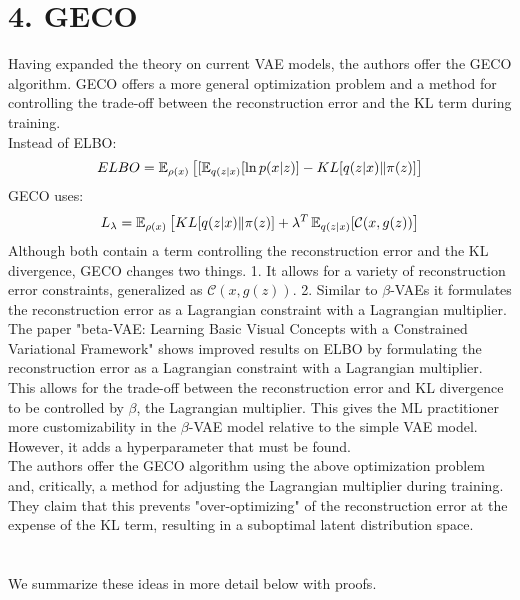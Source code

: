 \section*{4. GECO}
Having expanded the theory on current VAE models, the authors offer the GECO algorithm. GECO offers a more general optimization problem and a method for controlling the trade-off between the reconstruction error and the KL term during training.\\
Instead of ELBO:
\begin{gather*}
{ELBO} =  \operatorname{\mathbb{E}}_{\rho(x)}\left[[\operatorname{\mathbb{E}}_{q(z|x)}[\ln{p(x|z)}] - KL[q(z|x) \| \pi(z)]\right]
\end{gather*}
GECO uses:
\begin{gather*}
L_{\lambda} = \operatorname{\mathbb{E}}_{\rho(x)}\left[KL[q(z|x) \| \pi(z)] + \lambda^{T}\operatorname{\mathbb{E}}_{q(z|x)}[\mathcal{C}(x, g(z))\right]
\end{gather*}
Although both contain a term controlling the reconstruction error and the KL divergence, GECO changes two things. 1. It allows for a variety of reconstruction error constraints, generalized as $\mathcal{C}(x, g(z))$. 2. Similar to $\beta$-VAEs it formulates the reconstruction error as a Lagrangian constraint with a Lagrangian multiplier.\\
The paper "beta-VAE: Learning Basic Visual Concepts with a Constrained Variational Framework" shows improved results on ELBO by formulating the reconstruction error as a Lagrangian constraint with a Lagrangian multiplier. This allows for the trade-off between the reconstruction error and KL divergence to be controlled by $\beta$, the Lagrangian multiplier. This gives the ML practitioner more customizability in the $\beta$-VAE model relative to the simple VAE model. However, it adds a hyperparameter that must be found.\\
The authors offer the GECO algorithm using the above optimization problem and, critically, a method for adjusting the Lagrangian multiplier during training. They claim that this prevents "over-optimizing" of  the reconstruction error at the expense of the KL term, resulting in a suboptimal latent distribution space.

\section*{}
We summarize these ideas in more detail below with proofs.
